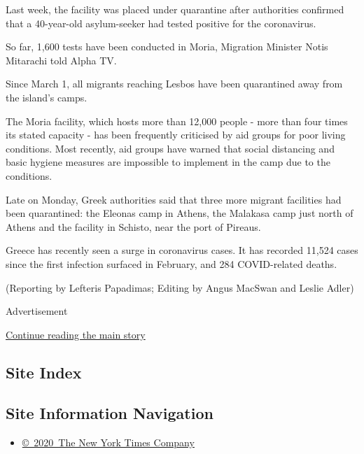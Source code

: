 Last week, the facility was placed under quarantine after authorities
confirmed that a 40-year-old asylum-seeker had tested positive for the
coronavirus.

So far, 1,600 tests have been conducted in Moria, Migration Minister
Notis Mitarachi told Alpha TV.

Since March 1, all migrants reaching Lesbos have been quarantined away
from the island's camps.

The Moria facility, which hosts more than 12,000 people - more than four
times its stated capacity - has been frequently criticised by aid groups
for poor living conditions. Most recently, aid groups have warned that
social distancing and basic hygiene measures are impossible to implement
in the camp due to the conditions.

Late on Monday, Greek authorities said that three more migrant
facilities had been quarantined: the Eleonas camp in Athens, the
Malakasa camp just north of Athens and the facility in Schisto, near the
port of Pireaus.

Greece has recently seen a surge in coronavirus cases. It has recorded
11,524 cases since the first infection surfaced in February, and 284
COVID-related deaths.

(Reporting by Lefteris Papadimas; Editing by Angus MacSwan and Leslie
Adler)

Advertisement

\protect\hyperlink{after-bottom}{Continue reading the main story}

\hypertarget{site-index}{%
\subsection{Site Index}\label{site-index}}

\hypertarget{site-information-navigation}{%
\subsection{Site Information
Navigation}\label{site-information-navigation}}

\begin{itemize}
\tightlist
\item
  \href{https://help.nytimes3xbfgragh.onion/hc/en-us/articles/115014792127-Copyright-notice}{©~2020~The
  New York Times Company}
\end{itemize}

